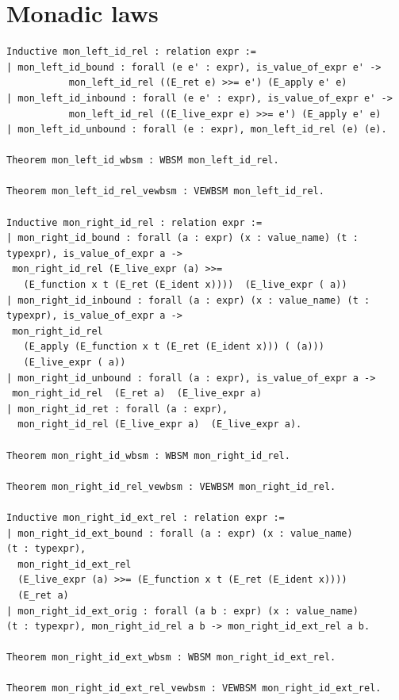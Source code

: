 \documentclass[12pt,twoside,notitlepage]{report}
\theoremstyle{plain}%
\theoremstyle{definition}
\theoremstyle{remark}
\begin{document}
\section{Monadic laws}
\begin{minipage}{\linewidth}
\begin{lstlisting}[language={Coq}, caption={Monadic left and right ret neutrality},numbersep=11pt]
Inductive mon_left_id_rel : relation expr :=
| mon_left_id_bound : forall (e e' : expr), is_value_of_expr e' -> 
           mon_left_id_rel ((E_ret e) >>= e') (E_apply e' e)
| mon_left_id_inbound : forall (e e' : expr), is_value_of_expr e' -> 
           mon_left_id_rel ((E_live_expr e) >>= e') (E_apply e' e)
| mon_left_id_unbound : forall (e : expr), mon_left_id_rel (e) (e).

Theorem mon_left_id_wbsm : WBSM mon_left_id_rel.

Theorem mon_left_id_rel_vewbsm : VEWBSM mon_left_id_rel.

Inductive mon_right_id_rel : relation expr :=
| mon_right_id_bound : forall (a : expr) (x : value_name) (t : typexpr), is_value_of_expr a ->
 mon_right_id_rel (E_live_expr (a) >>= 
   (E_function x t (E_ret (E_ident x))))  (E_live_expr ( a))
| mon_right_id_inbound : forall (a : expr) (x : value_name) (t : typexpr), is_value_of_expr a ->
 mon_right_id_rel 
   (E_apply (E_function x t (E_ret (E_ident x))) ( (a)))
   (E_live_expr ( a))
| mon_right_id_unbound : forall (a : expr), is_value_of_expr a ->
 mon_right_id_rel  (E_ret a)  (E_live_expr a)
| mon_right_id_ret : forall (a : expr), 
  mon_right_id_rel (E_live_expr a)  (E_live_expr a).

Theorem mon_right_id_wbsm : WBSM mon_right_id_rel.

Theorem mon_right_id_rel_vewbsm : VEWBSM mon_right_id_rel.

Inductive mon_right_id_ext_rel : relation expr :=
| mon_right_id_ext_bound : forall (a : expr) (x : value_name) 
(t : typexpr),
  mon_right_id_ext_rel 
  (E_live_expr (a) >>= (E_function x t (E_ret (E_ident x))))  
  (E_ret a)
| mon_right_id_ext_orig : forall (a b : expr) (x : value_name) 
(t : typexpr), mon_right_id_rel a b -> mon_right_id_ext_rel a b.

Theorem mon_right_id_ext_wbsm : WBSM mon_right_id_ext_rel.

Theorem mon_right_id_ext_rel_vewbsm : VEWBSM mon_right_id_ext_rel.
\end{lstlisting}
\end{minipage}
\end{document}
